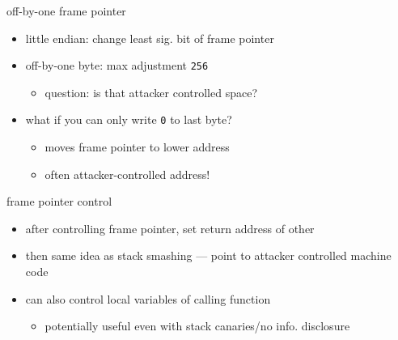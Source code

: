 \begin{frame}{off-by-one frame pointer}
    \begin{itemize}
    \item little endian: change least sig. bit of frame pointer
    \item off-by-one byte: max adjustment {\tt 256}
        \begin{itemize}
        \item question: is that attacker controlled space?
        \end{itemize}
    \item what if you can only write {\tt 0} to last byte?
        \begin{itemize}
        \item moves frame pointer to lower address
        \item often attacker-controlled address!
        \end{itemize}
    \end{itemize}
\end{frame}

\begin{frame}{frame pointer control}
    \begin{itemize}
    \item after controlling frame pointer, set return address of other
    \item then same idea as stack smashing --- point to attacker controlled machine code
    \vspace{.5cm}
    \item can also control local variables of calling function
        \begin{itemize}
        \item potentially useful even with stack canaries/no info. disclosure
        \end{itemize}
    \end{itemize}
\end{frame}

